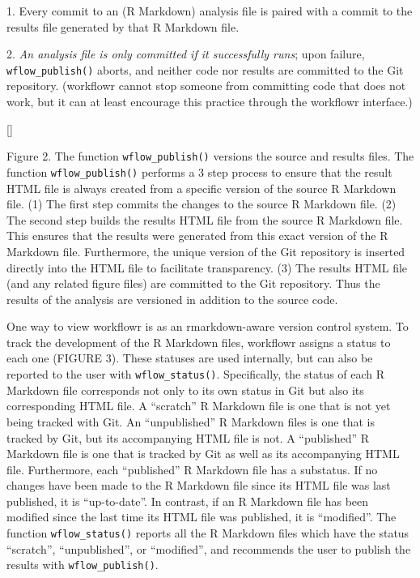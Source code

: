 \documentclass[9pt,a4paper]{extarticle}
\begin{document}
1. Every commit to an (R Markdown) analysis file is paired with a commit
to the results file generated by that R Markdown file.

2. \textit{An analysis file is only committed if it successfully runs};
upon failure, \verb|wflow_publish()| aborts, and neither code nor results are
committed to the Git repository. (workflowr cannot stop someone from
committing code that does not work, but it can at least encourage this
practice through the workflowr interface.)

[]

Figure 2. The function \verb|wflow_publish()| versions the source and results
files. The function \verb|wflow_publish()| performs a 3 step process to ensure
that the result HTML file is always created from a specific version of
the source R Markdown file. (1) The first step commits the changes to
the source R Markdown file. (2) The second step builds the results HTML
file from the source R Markdown file. This ensures that the results were
generated from this exact version of the R Markdown file. Furthermore,
the unique version of the Git repository is inserted directly into the
HTML file to facilitate transparency. (3) The results HTML file (and any
related figure files) are committed to the Git repository. Thus the
results of the analysis are versioned in addition to the source code.

One way to view workflowr is as an rmarkdown-aware version control
system. To track the development of the R Markdown files, workflowr
assigns a status to each one (FIGURE 3). These statuses are used
internally, but can also be reported to the user with \verb|wflow_status()|.
Specifically, the status of each R Markdown file corresponds not only to
its own status in Git but also its corresponding HTML file. A “scratch”
R Markdown file is one that is not yet being tracked with Git. An
“unpublished” R Markdown files is one that is tracked by Git, but its
accompanying HTML file is not. A “published” R Markdown file is one that
is tracked by Git as well as its accompanying HTML file. Furthermore,
each “published” R Markdown file has a substatus. If no changes have
been made to the R Markdown file since its HTML file was last published,
it is “up-to-date”. In contrast, if an R Markdown file has been modified
since the last time its HTML file was published, it is “modified”. The
function \verb|wflow_status()| reports all the R Markdown files which have the
status “scratch”, “unpublished”, or “modified”, and recommends the user
to publish the results with \verb|wflow_publish()|.
\end{document}
